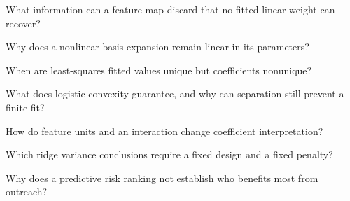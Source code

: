 \begin{studyquestions}
\item What information can a feature map discard that no fitted linear weight can recover?
\item Why does a nonlinear basis expansion remain linear in its parameters?
\item When are least-squares fitted values unique but coefficients nonunique?
\item What does logistic convexity guarantee, and why can separation still prevent a finite fit?
\item How do feature units and an interaction change coefficient interpretation?
\item Which ridge variance conclusions require a fixed design and a fixed penalty?
\item Why does a predictive risk ranking not establish who benefits most from outreach?
\end{studyquestions}

